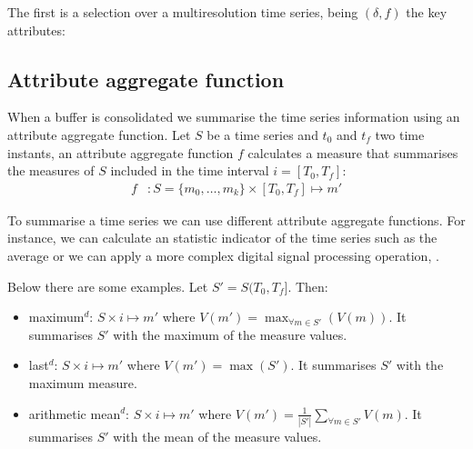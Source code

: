 The first is a selection over a multiresolution time series, being $(\delta,f)$ the key attributes: 



  








\subsection{Attribute aggregate function}
\label{sec:model:interpolador}

When a buffer is consolidated we summarise the time series information
using an attribute aggregate function.  Let $S$ be a time series and
$t_0$ and $t_f$ two time instants, an attribute aggregate function $f$
calculates a measure that summarises the measures of $S$ included in
the time interval $i=[T_0,T_f]$:
\begin{align*}
f&:S=\{m_0,\ldots,m_k\} \times [T_0,T_f] \mapsto m'
\end{align*}

To summarise a time series we can use different attribute aggregate
functions.  For instance, we can calculate an statistic indicator of
the time series such as the average or we can apply a more complex
digital signal processing operation, \cite{zhang11}.

Below there are some examples. Let $S'=S(T_0,T_f]$. Then:
\begin{itemize}
\renewcommand{\labelitemi}{--}
\item maximum$^d$: $S \times i \mapsto m'$ where $V(m') =
  \max_{\forall m \in S'}(V(m))$. It summarises $S'$ with the maximum
  of the measure values.
\item last$^d$: $S \times i \mapsto m'$ where $V(m') = \max(S')$. It
  summarises $S'$ with the maximum measure.
\item arithmetic mean$^d$: $S \times i \mapsto m'$ where $V(m') =
  \frac{1}{|S'|} \sum\limits_{\forall m\in S'} V(m)$. It
  summarises $S'$ with the mean of the measure values.
\end{itemize}


